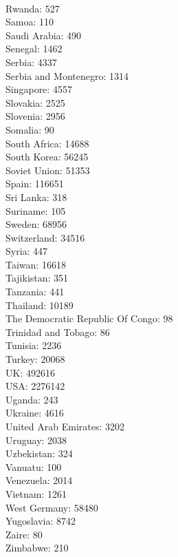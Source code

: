 \begin{multicols}{4}
  \\ Rwanda:	527
  \\ Samoa:	110
  \\ Saudi Arabia:	490
  \\ Senegal:	1462
  \\ Serbia:	4337
  \\ Serbia and Montenegro:	1314
  \\ Singapore:	4557
  \\ Slovakia:	2525
  \\ Slovenia:	2956
  \\ Somalia:	90
  \\ South Africa:	14688
  \\ South Korea:	56245
  \\ Soviet Union:	51353
  \\ Spain:	116651
  \\ Sri Lanka:	318
  \\ Suriname:	105
  \\ Sweden:	68956
  \\ Switzerland:	34516
  \\ Syria:	447
  \\ Taiwan:	16618
  \\ Tajikistan:	351
  \\ Tanzania:	441
  \\ Thailand:	10189
  \\ The Democratic Republic Of Congo:	98
  \\ Trinidad and Tobago:	86
  \\ Tunisia:	2236
  \\ Turkey:	20068
  \\ UK:	492616
  \\ USA:	2276142
  \\ Uganda:	243
  \\ Ukraine:	4616
  \\ United Arab Emirates:	3202
  \\ Uruguay:	2038
  \\ Uzbekistan:	324
  \\ Vanuatu:	100
  \\ Venezuela:	2014
  \\ Vietnam:	1261
  \\ West Germany:	58480
  \\ Yugoslavia:	8742
  \\ Zaire:	80
  \\ Zimbabwe:	210
\end{multicols}

